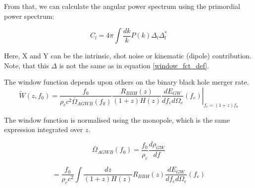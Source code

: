 From that, we can calculate the angular power spectrum using the primordial power 
spectrum:

\begin{equation}
    C_l = 4\pi \int \frac{dk}{k} P(k) \Delta_l \Delta_l^*
\end{equation}

Here, X and Y can be the intrinsic, shot noise or kinematic (dipole) contribution.
Note, that this $\Delta$ is not the same as in equation \ref{window_fct_def}.

The window function depends upon others on the binary black hole merger rate.
\begin{equation}
\label{window}
    \tilde{W}(z, f_0)=\frac{f_0}{\rho_c c^2 \bar{\Omega}_{AGWB}(f_0)}
    \frac{R_{BBH}(z)}{(1+z)H(z)} \left. \frac{dE_{GW}}{df_e d\Omega_e}(f_e)\right|_{f_e=(1+z)f_0}
\end{equation}

The window function is normalised using the monopole, which is the same expression integrated over $z$.

\begin{equation}
    \bar{\Omega}_{AGWB}(f_0)= \frac{f_0}{\rho_c}\frac{d\rho_{GW}}{df}
\end{equation}

\begin{equation}
    = \frac{f_0}{\rho_c c^2 } \int \frac{dz}{(1+z)H(z)} R_{BBH}(z) \frac{dE_{GW}}{df_e d\Omega_e}(f_e)
\end{equation}

